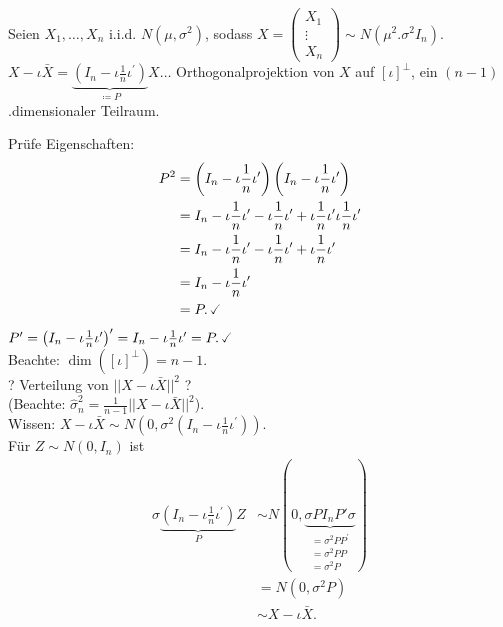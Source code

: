 \documentclass{tstextbook}
\begin{document}
\begin{example}
	
	Seien $ X_1, \ldots, X_n $ i.i.d. $ N(\mu, \sigma^2) $, sodass $ X = \begin{pmatrix}
		X_1 \\ \vdots \\ X_n
	\end{pmatrix} \sim N(\mu^2. \sigma^2 I_n) $. \\
	
	$ X - \iota\bar{X}  = \underbrace{\left(I_n - \iota \frac{1}{n} \iota^\prime\right)}_{\coloneqq P} X \ldots $ Orthogonalprojektion von $ X $ auf $ [\iota]^\perp $, ein $ (n-1) $.dimensionaler Teilraum.
	
	Prüfe Eigenschaften: 
	\[
	\begin{aligned}
		P^2 & = \left(I_n - \iota \frac{1}{n} \iota^\prime\right)\left(I_n - \iota \frac{1}{n} \iota^\prime\right) \\
		& = I_n - \iota \frac{1}{n} \iota^\prime - \iota \frac{1}{n} \iota^\prime + \iota \frac{1}{n} \iota^\prime \iota \frac{1}{n} \iota^\prime \\
		& = I_n - \iota \frac{1}{n} \iota^\prime - \iota \frac{1}{n}\iota^\prime + \iota \frac{1}{n} \iota^\prime \\
		& = I_n - \iota \frac{1}{n} \iota^\prime \\
		& = P. \, \checked
	\end{aligned}
	\]
	$ P^\prime = \left(I_n - \iota \frac{1}{n} \iota^\prime\right)^\prime = I_n - \iota \frac{1}{n} \iota^\prime = P. \, \checked $ \\
	Beachte: $  \dim\left([\iota]^\perp\right) = n-1 $. \\
	
	? Verteilung von $ ||X-\iota \bar{X}||^2 $ ? \\
	
	(Beachte: $ \hat{\sigma}_n^2 = \frac{1}{n-1} ||X-\iota\bar{X}||^2 $).\\
	Wissen: $ X-\iota \bar{X} \sim N\left(0, \sigma^2\left(I_n -\iota\frac{1}{n}\iota^\prime \right)\right) $. \\
	Für $ Z \sim N(0,I_n) $ ist 
	\[
	\begin{aligned}
		\sigma \underbrace{\left(I_n -\iota\frac{1}{n}\iota^\prime \right)}_P Z & \sim N(0, \underbrace{\sigma PI_n P\prime \sigma}_{\substack{= \sigma^2PP^\prime \\ = \sigma^2 PP \\ = \sigma^2 P}}) \\
		& = N(0, \sigma^2 P) \\
		& \sim X- \iota \bar{X}.
	\end{aligned}
	\]
	

\end{example}
\end{document}
